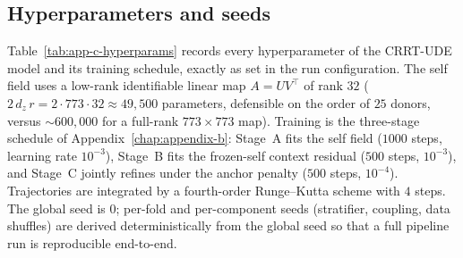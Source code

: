 \subsection{Hyperparameters and seeds}\label{sec:app-c-hyperparams}

Table~\ref{tab:app-c-hyperparams} records every hyperparameter of the CRRT-UDE model and its training
schedule, exactly as set in the run configuration. The self field uses a low-rank identifiable linear
map $A = UV^{\top}$ of rank $32$ ($2\,d_z\,r = 2\cdot773\cdot32 \approx 49{,}500$ parameters, defensible
on the order of $25$ donors, versus $\sim\!600{,}000$ for a full-rank $773\times773$ map). Training is
the three-stage schedule of Appendix~\ref{chap:appendix-b}: Stage~A fits the self field
($1000$ steps, learning rate $10^{-3}$), Stage~B fits the frozen-self context residual
($500$ steps, $10^{-3}$), and Stage~C jointly refines under the anchor penalty
($500$ steps, $10^{-4}$). Trajectories are integrated by a fourth-order Runge--Kutta scheme with
$4$ steps. The global seed is $0$; per-fold and per-component seeds (stratifier, coupling, data
shuffles) are derived deterministically from the global seed so that a full pipeline run is
reproducible end-to-end.


